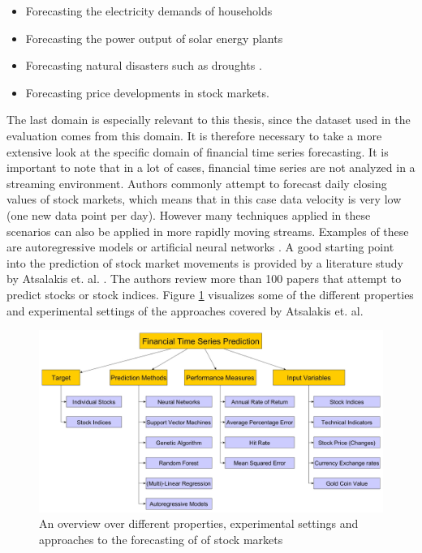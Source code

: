 \begin{itemize}
	\item Forecasting the electricity demands of households \cite{veit2014household}
	\item Forecasting the power output of solar energy plants \cite{inman2013solar}
	\item Forecasting natural disasters such as droughts \cite{mishra2006drought}.
	\item Forecasting price developments in stock markets.
\end{itemize}

The last domain is especially relevant to this thesis, since the dataset used in the evaluation comes from this domain. It is therefore necessary to take a more extensive look at the specific domain of financial time series forecasting. It is important to note that in a lot of cases, financial time series are not analyzed in a streaming environment. Authors commonly attempt to forecast daily closing values of stock markets, which means that in this case data velocity is very low (one new data point per day). However many techniques applied in these scenarios can also be applied in more rapidly moving streams. Examples of these are autoregressive models \cite{terasvirta1994specification} or artificial neural networks \cite{gama2010knowledge}. \newline
A good starting point into the prediction of stock market movements is provided by a literature study by Atsalakis et. al. \cite{atsalakis2009surveying}. The authors review more than 100 papers that attempt to predict stocks or stock indices. Figure \ref{fig_financialTimeSeriesPredictionOverview} visualizes some of the different properties and experimental settings of the approaches covered by Atsalakis et. al.

\begin{figure}[h]
	\centering
  	\includegraphics[width=\textwidth]{financialTimeSeriesPredictionOverview}
	\caption{An overview over different properties, experimental settings and approaches to the forecasting of of stock markets}
	\label{fig_financialTimeSeriesPredictionOverview}
\end{figure}

